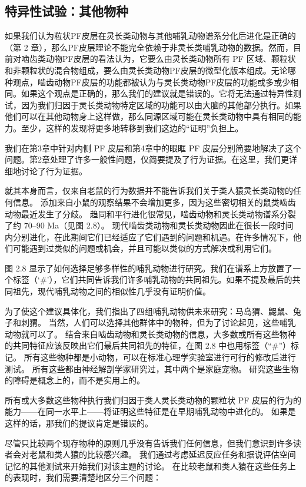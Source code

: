 \subsection{特异性试验：其他物种} 
如果我们认为粒状PF皮层在灵长类动物与其他哺乳动物谱系分化后进化是正确的（第 2 章），那么PF皮层理论不能完全依赖于非灵长类哺乳动物的数据。然而，目前对啮齿类动物PF皮层的看法认为，它要么由灵长类动物所有 PF 区域、颗粒状和非颗粒状的混合物组成，要么由灵长类动物PF皮层的微型化版本组成。无论哪种观点，啮齿动物PF皮层的功能都被认为与灵长类动物PF皮层的功能或多或少相同。如果这个观点是正确的，那么我们的建议就是错误的。它将无法通过特异性测试，因为我们归因于灵长类动物特定区域的功能可以由大脑的其他部分执行。如果他们可以在其他动物身上这样做，那么同源区域可能在灵长类动物中具有相同的能力。至少，这样的发现将更多地转移到我们这边的“证明”负担上。
\par 
我们在第3章中针对内侧 PF 皮层和第4章中的眼眶 PF 皮层分别简要地解决了这个问题。第2章处理了许多一般性问题，仅简要提及了行为证据。在这里，我们更详细地讨论了行为证据。
\par 
就其本身而言，仅来自老鼠的行为数据并不能告诉我们关于类人猿灵长类动物的任何信息。 添加来自小鼠的观察结果不会增加更多，因为这些密切相关的鼠类啮齿动物最近发生了分歧。 趋同和平行进化很常见，啮齿动物和灵长类动物谱系分裂了约 70–90 Ma（见图 2.8）。 现代啮齿类动物和灵长类动物因此在很长一段时间内分别进化，在此期间它们已经适应了它们遇到的问题和机遇。在许多情况下，他们可能遇到过类似的问题或机会，并且可能以类似的方式解决或利用它们。
\par 
图 2.8 显示了如何选择足够多样性的哺乳动物进行研究。我们在谱系上方放置了一个标签（‘#’），它们共同告诉我们许多哺乳动物的共同祖先。如果不提及最后的共同祖先，现代哺乳动物之间的相似性几乎没有证明价值。
\par 
为了使这个建议具体化，我们指出了四组哺乳动物供未来研究：马岛猬、鼹鼠、兔子和刺猬。 当然，人们可以选择其他群体中的物种，但为了讨论起见，这些哺乳动物就可以了。 结合来自啮齿动物和灵长类动物的信息，大多数或所有这些物种的共同特征应该反映出它们最后共同祖先的特征，在图 2.8 中也用标签（“#”）标记。 所有这些物种都是小动物，可以在标准心理学实验室进行可行的修改后进行测试。 所有这些都由神经解剖学家研究过，其中两个是家庭宠物。 研究这些生物的障碍是概念上的，而不是实用上的。
\par 
所有或大多数这些物种执行我们归因于类人灵长类动物的颗粒状 PF 皮层的行为的能力——在同一水平上——将证明这些特征是在早期哺乳动物中进化的。 如果是这样的话，那我们的提议肯定是错误的。
\par 
尽管只比较两个现存物种的原则几乎没有告诉我们任何信息，但我们意识到许多读者会对老鼠和类人猿的比较感兴趣。 我们通过考虑延迟反应任务和据说评估空间记忆的其他测试来开始我们对该主题的讨论。 在比较老鼠和类人猿在这些任务上的表现时，我们需要清楚地区分三个问题：
